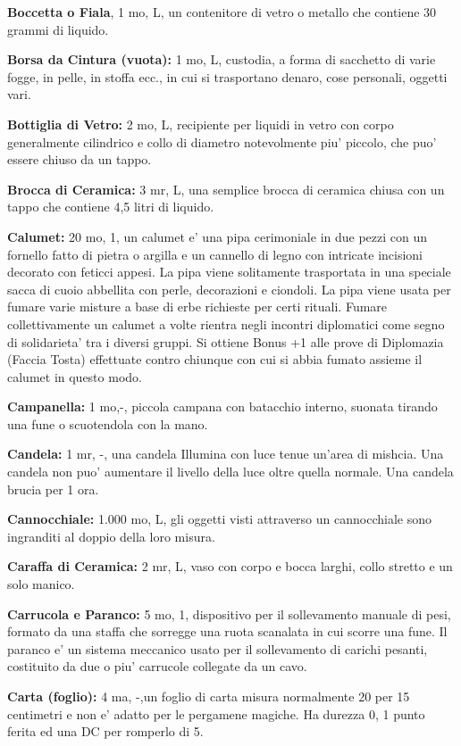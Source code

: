 \documentclass[a4paper,11pt,twoside,openany]{book}
\begin{document}
{\textbf{Boccetta o Fiala}, 1 mo, L, un contenitore di vetro o metallo che contiene 30 grammi di liquido.

\textbf{Borsa da Cintura (vuota):} 1 mo, L, custodia, a forma di sacchetto di varie fogge, in pelle, in stoffa ecc., in cui si trasportano denaro, cose personali, oggetti vari.

\textbf{Bottiglia di Vetro:} 2 mo, L, recipiente per liquidi in vetro con corpo generalmente cilindrico e collo di diametro notevolmente piu' piccolo, che puo' essere chiuso da un tappo.

\textbf{Brocca di Ceramica:} 3 mr, L, una semplice brocca di ceramica chiusa con un tappo che contiene 4,5 litri di liquido.

\textbf{Calumet:} 20 mo, 1, un calumet e' una pipa cerimoniale in due pezzi con un fornello fatto di pietra o argilla e un cannello di legno con intricate incisioni decorato con feticci appesi. La pipa viene solitamente trasportata in una speciale sacca di cuoio abbellita con perle, decorazioni e ciondoli. La pipa viene usata per fumare varie misture a base di erbe richieste per certi rituali. Fumare collettivamente un calumet a volte rientra negli incontri diplomatici come segno di solidarieta' tra i diversi gruppi. Si ottiene Bonus +1 alle prove di Diplomazia (Faccia Tosta) effettuate contro chiunque con cui si abbia fumato assieme il calumet in questo modo.

\textbf{Campanella:} 1 mo,-, piccola campana con batacchio interno, suonata tirando una fune o scuotendola con la mano.

\textbf{Candela:} 1 mr, -, una candela Illumina con luce tenue un'area di mishcia. Una candela non puo' aumentare il livello della luce oltre quella normale. Una candela brucia per 1 ora.

\textbf{Cannocchiale:} 1.000 mo, L, gli oggetti visti attraverso un cannocchiale sono ingranditi al doppio della loro misura.

\textbf{Caraffa di Ceramica:} 2 mr, L, vaso con corpo e bocca larghi, collo stretto e un solo manico.

\textbf{Carrucola e Paranco:} 5 mo, 1, dispositivo per il sollevamento manuale di pesi, formato da una staffa che sorregge una ruota scanalata in cui scorre una fune. Il paranco e' un sistema meccanico usato per il sollevamento di carichi pesanti, costituito da due o piu' carrucole collegate da un cavo.

\textbf{Carta (foglio):} 4 ma, -,un foglio di carta misura normalmente 20 per 15 centimetri e non e' adatto per le pergamene magiche. Ha durezza 0, 1 punto ferita ed una DC per romperlo di 5.

}
\end{document}
